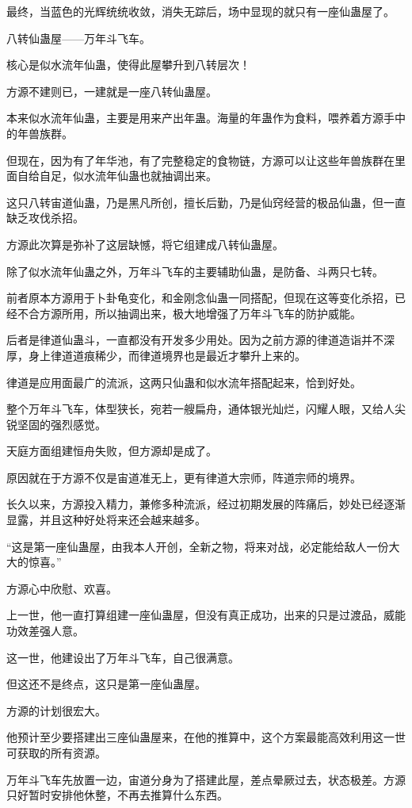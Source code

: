 \begin{this_body}
最终，当蓝色的光辉统统收敛，消失无踪后，场中显现的就只有一座仙蛊屋了。

八转仙蛊屋——万年斗飞车。

核心是似水流年仙蛊，使得此屋攀升到八转层次！

方源不建则已，一建就是一座八转仙蛊屋。

本来似水流年仙蛊，主要是用来产出年蛊。海量的年蛊作为食料，喂养着方源手中的年兽族群。

但现在，因为有了年华池，有了完整稳定的食物链，方源可以让这些年兽族群在里面自给自足，似水流年仙蛊也就抽调出来。

这只八转宙道仙蛊，乃是黑凡所创，擅长后勤，乃是仙窍经营的极品仙蛊，但一直缺乏攻伐杀招。

方源此次算是弥补了这层缺憾，将它组建成八转仙蛊屋。

除了似水流年仙蛊之外，万年斗飞车的主要辅助仙蛊，是防备、斗两只七转。

前者原本方源用于卜卦龟变化，和金刚念仙蛊一同搭配，但现在这等变化杀招，已经不合方源所用，所以抽调出来，极大地增强了万年斗飞车的防护威能。

后者是律道仙蛊斗，一直都没有开发多少用处。因为之前方源的律道造诣并不深厚，身上律道道痕稀少，而律道境界也是最近才攀升上来的。

律道是应用面最广的流派，这两只仙蛊和似水流年搭配起来，恰到好处。

整个万年斗飞车，体型狭长，宛若一艘扁舟，通体银光灿烂，闪耀人眼，又给人尖锐坚固的强烈感觉。

天庭方面组建恒舟失败，但方源却是成了。

原因就在于方源不仅是宙道准无上，更有律道大宗师，阵道宗师的境界。

长久以来，方源投入精力，兼修多种流派，经过初期发展的阵痛后，妙处已经逐渐显露，并且这种好处将来还会越来越多。

“这是第一座仙蛊屋，由我本人开创，全新之物，将来对战，必定能给敌人一份大大的惊喜。”

方源心中欣慰、欢喜。

上一世，他一直打算组建一座仙蛊屋，但没有真正成功，出来的只是过渡品，威能功效差强人意。

这一世，他建设出了万年斗飞车，自己很满意。

但这还不是终点，这只是第一座仙蛊屋。

方源的计划很宏大。

他预计至少要搭建出三座仙蛊屋来，在他的推算中，这个方案最能高效利用这一世可获取的所有资源。

万年斗飞车先放置一边，宙道分身为了搭建此屋，差点晕厥过去，状态极差。方源只好暂时安排他休整，不再去推算什么东西。


\end{this_body}
